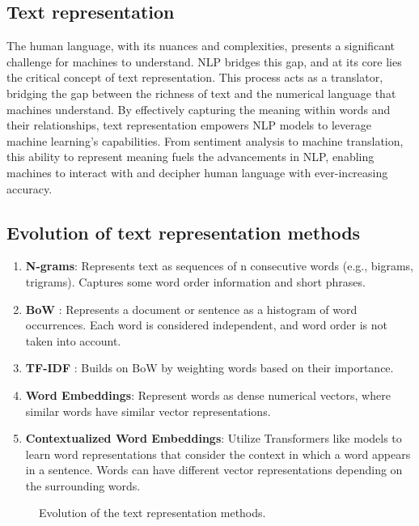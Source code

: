 \subsection{Text representation}
The human language, with its nuances and complexities, presents a significant challenge for machines to understand.
\ac{NLP} bridges this gap, and at its core lies the critical concept of text representation.
This process acts as a translator, bridging the gap between the richness of text and the numerical language that machines understand.
By effectively capturing the meaning within words and their relationships, text representation empowers \ac{NLP} models to leverage machine learning's capabilities.
From sentiment analysis to machine translation, this ability to represent meaning fuels the advancements in \ac{NLP}, enabling machines to interact with and decipher human language with ever-increasing accuracy.

\subsection{Evolution of text representation methods}

\begin{enumerate}
  \item \textbf{N-grams}: Represents text as sequences of n consecutive words (e.g., bigrams, trigrams). Captures some word order information and short phrases.
  \item \textbf{\ac{BoW}} \cite{bow} : Represents a document or sentence as a histogram of word occurrences. Each word is considered independent, and word order is not taken into account.
  \item \textbf{\ac{TF-IDF}} \cite{tf-idf} : Builds on \ac{BoW} by weighting words based on their importance.
  \item \textbf{Word Embeddings}: Represent words as dense numerical vectors, where similar words have similar vector representations.
  \item \textbf{Contextualized Word Embeddings}: Utilize Transformers like models to learn word representations that consider the context in which a word appears in a sentence. Words can have different vector representations depending on the surrounding words.
\end{enumerate}

\begin{figure}
  \centering
    
  \caption{Evolution of the text representation methods.}
  \label{fig:ecolution_text_representation}
\end{figure}



